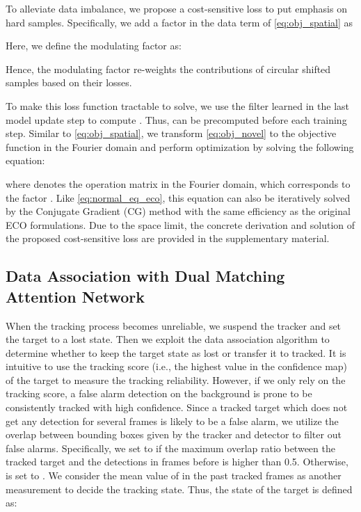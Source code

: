 \documentclass[runningheads]{llncs}
\begin{document}
  To alleviate data imbalance, we propose a cost-sensitive loss to put emphasis on hard samples. 
Specifically, we add a factor  in the data term of \eqref{eq:obj_spatial} as
  
  Here, we define the modulating factor  as:
  
  Hence, the modulating factor  re-weights the contributions of circular shifted samples based on their losses.
  
  To make this loss function tractable to solve, we use the filter learned in the last model update step to compute . Thus,  can be precomputed before each training step. 
Similar to \eqref{eq:obj_spatial}, we transform \eqref{eq:obj_novel} to the objective function in the Fourier domain and perform optimization by solving the following equation:
  
  where  denotes the operation matrix in the Fourier domain, which corresponds to the factor . Like \eqref{eq:normal_eq_eco}, this equation can also be iteratively solved by the Conjugate Gradient
  (CG) method with the same efficiency as the original ECO formulations. Due to the space limit, the concrete derivation and solution  of the proposed cost-sensitive loss are provided in the supplementary material.
  
  \subsection{Data Association with Dual Matching Attention Network}
  When the tracking process becomes unreliable, we suspend the tracker and set the target to a lost state. Then we exploit the data association algorithm to determine whether to keep the target state as lost or transfer it to tracked. It is intuitive to use the tracking score  (i.e., the highest value in the confidence map) of the target to measure the tracking reliability. However, if we only rely on the tracking score, a false alarm detection on the background is prone to be consistently tracked with high confidence. Since a tracked target which does not get any detection for several frames is likely to be a false alarm, we utilize the overlap between bounding boxes given by the tracker and detector to filter out false alarms. Specifically, we set  to  if the maximum overlap ratio between the tracked target  and the detections  in  frames before is higher than 0.5. Otherwise,  is set to . We consider the mean value of  in the past  tracked frames  as another measurement to decide the tracking state. Thus, the state of the target is defined as:
  
\end{document}
